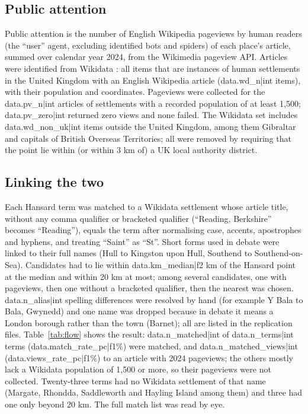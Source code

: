 \documentclass[11pt,a4paper]{article}
\begin{document}
\subsection{Public attention}
Public attention is the number of English Wikipedia pageviews by human readers (the ``user'' agent, excluding identified bots and spiders) of each place's article, summed over calendar year 2024, from the Wikimedia pageview API. Articles were identified from Wikidata \citep{Vrandecic2014}: all items that are instances of human settlements in the United Kingdom with an English Wikipedia article ({{data.wd_n|int}} items), with their population and coordinates. Pageviews were collected for the {{data.pv_n|int}} articles of settlements with a recorded population of at least 1,500; {{data.pv_zero|int}} returned zero views and none failed. The Wikidata set includes {{data.wd_non_uk|int}} items outside the United Kingdom, among them Gibraltar and capitals of British Overseas Territories; all were removed by requiring that the point lie within (or within 3 km of) a UK local authority district.

\subsection{Linking the two}
Each Hansard term was matched to a Wikidata settlement whose article title, without any comma qualifier or bracketed qualifier (``Reading, Berkshire'' becomes ``Reading''), equals the term after normalising case, accents, apostrophes and hyphens, and treating ``Saint'' as ``St''. Short forms used in debate were linked to their full names (Hull to Kingston upon Hull, Southend to Southend-on-Sea). Candidates had to lie within {{data.km_median|f2}} km of the Hansard point at the median and within 20 km at most; among several candidates, one with pageviews, then one without a bracketed qualifier, then the nearest was chosen. {{data.n_alias|int}} spelling differences were resolved by hand (for example Y Bala to Bala, Gwynedd) and one name was dropped because in debate it means a London borough rather than the town (Barnet); all are listed in the replication files. Table~\ref{tab:flow} shows the result: {{data.n_matched|int}} of {{data.n_terms|int}} terms ({{data.match_rate_pc|f1}}\%) were matched, and {{data.n_matched_views|int}} ({{data.views_rate_pc|f1}}\%) to an article with 2024 pageviews; the others mostly lack a Wikidata population of 1,500 or more, so their pageviews were not collected. Twenty-three terms had no Wikidata settlement of that name (Margate, Rhondda, Saddleworth and Hayling Island among them) and three had one only beyond 20 km. The full match list was read by eye.
\end{document}
